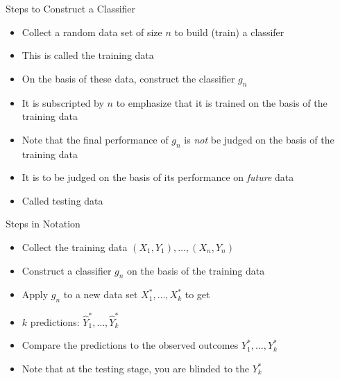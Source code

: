 \documentclass[xcolor=x11names,compress]{beamer}\usepackage[]{graphicx}\usepackage[]{color}
\begin{document}
\begin{frame}{Steps to Construct a Classifier}
  \begin{itemize}
  \item Collect a random data set of size $n$ to build (train) a classifer 
  \item This is called the training data
  \item On the basis of these data, construct the classifier $g_n$
  \item It is subscripted by $n$ to emphasize that it is trained on the
        basis of the training data
  \item Note that the final performance of $g_n$ is {\it not} 
         be judged on the basis of the training data
  \item It is to be judged on the basis of its performance on {\it future} data
  \item Called testing data
  \end{itemize}
\end{frame}


\begin{frame}{Steps in Notation}
  \begin{itemize}
  \item Collect the training data $(X_1,Y_1),\ldots,(X_n,Y_n)$
  \item Construct a classifier $g_n$ on the basis of the training data
  \item Apply $g_n$ to a new data set $X^*_1,\ldots,X_k^*$ to get
  \item $k$ predictions: $\hat{Y}_1^*,\ldots,\hat{Y}_k^*$
  \item Compare the predictions to the observed outcomes $Y^*_1,\ldots,Y^*_k$
  \item Note that at the testing stage, you are blinded to the $Y^*_k$
  \end{itemize}
\end{frame}





\end{document}
